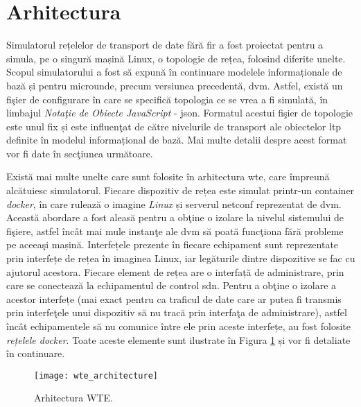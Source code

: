 \section{Arhitectura}

Simulatorul rețelelor de transport de date fără fir a fost proiectat pentru a simula, pe o singură mașină Linux, o topologie de rețea, folosind diferite unelte. Scopul simulatorului a fost să expună în continuare modelele informaționale de bază și pentru microunde, precum versiunea precedentă, \gls{dvm}. Astfel, există un fişier de configurare în care se specifică topologia ce se vrea a fi simulată, în limbajul \textit{Notaţie de Obiecte JavaScript} - \gls{json}. Formatul acestui fişier de topologie este unul fix și este influenţat de către nivelurile de transport ale obiectelor \gls{ltp} definite în modelul informațional de bază. Mai multe detalii despre acest format vor fi date în secţiunea următoare.

Există mai multe unelte care sunt folosite în arhitectura \gls{wte}, care împreună alcătuiesc simulatorul. Fiecare dispozitiv de rețea este simulat printr-un container \textit{docker}, în care rulează o imagine \textit{Linux} și serverul \gls{netconf} reprezentat de \gls{dvm}. Această abordare a fost aleasă pentru a obţine o izolare la nivelul sistemului de fişiere, astfel încât mai mule instanţe ale \gls{dvm} să poată funcţiona fără probleme pe aceeaşi mașină. Interfețele prezente în fiecare echipament sunt reprezentate prin interfețe de rețea în imaginea Linux, iar legăturile dintre dispozitive se fac cu ajutorul acestora. Fiecare element de rețea are o interfață de administrare, prin care se conectează la echipamentul de control \gls{sdn}. Pentru a obţine o izolare a acestor interfețe (mai exact pentru ca traficul de date care ar putea fi transmis prin interfeţele unui dispozitiv să nu tracă prin interfaţa de administrare), astfel încât echipamentele să nu comunice între ele prin aceste interfețe, au fost folosite \textit{rețelele docker}. Toate aceste elemente sunt ilustrate în Figura \ref{fig:wte_architecture} și vor fi detaliate în continuare.

\begin{figure}[h]
	\centering
	\texttt{[image: wte\_architecture]}
	\caption{Arhitectura WTE.}
	\label{fig:wte_architecture}
\end{figure}

